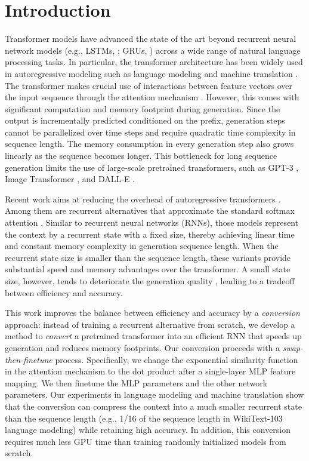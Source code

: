 \documentclass[11pt]{article}
\newcommand{\interalia}[1]{\citep[\emph{inter alia}]{#1}}
\begin{document}
\section{Introduction}
Transformer models \cite{Vaswani2017AttentionIA} have advanced the state of the art beyond recurrent neural network models (e.g., LSTMs, \citealp{hochreiter1997long}; GRUs, \citealp{cho-etal-2014-properties}) across a wide range of natural language processing tasks.
In particular, the transformer architecture has been widely used in autoregressive modeling such as language modeling \cite{Baevski2019AdaptiveIR} and machine translation \cite{Vaswani2017AttentionIA}.
The transformer makes crucial use of interactions between feature vectors over the input sequence through the attention mechanism \citep{Bahdanau2014NeuralMT}.
However, this comes with significant computation and memory footprint during generation.
Since the output is incrementally predicted 
conditioned on the prefix, generation steps cannot be parallelized over time steps
and require quadratic time complexity in sequence length.
The memory consumption in every generation step also grows linearly as the sequence becomes longer.
This bottleneck for long sequence generation limits the use of large-scale pretrained transformers, such as GPT-3 \cite{gpt3}, Image Transformer \cite{imagetransformer}, and DALL-E \cite{DALLE}.


Recent work aims at reducing 
the overhead
of autoregressive transformers \interalia{Child2019, Kitaev2020ReformerTE, longformer}. 
Among them are recurrent alternatives that approximate the standard softmax attention \cite{katharopoulos-et-al-2020, RFA, performer,schlag2021linear}.
Similar to recurrent neural networks (RNNs), those models represent the context by a recurrent state with a fixed size, thereby achieving linear time and constant memory complexity in generation sequence length.
When the recurrent state size is smaller than the sequence length, these variants provide substantial speed and memory advantages over the transformer.
A small state size, however, tends to deteriorate the generation quality \cite{RFA}, leading to a tradeoff between efficiency and accuracy.

This work improves the balance between efficiency and accuracy by a \textit{conversion} approach: instead of training a recurrent alternative from scratch, we develop a method to \textit{convert} a pretrained transformer into an efficient RNN that speeds up generation and reduces memory footprints.
Our conversion proceeds with a \textit{swap-then-finetune} process.
Specifically, we change the exponential similarity function in the attention mechanism to the dot product after a single-layer MLP feature mapping.
We then finetune the MLP parameters and the other network parameters.
Our experiments in language modeling and machine translation show that the conversion can compress the context into a much smaller recurrent state than the sequence length (e.g., 1/16 of the sequence length in WikiText-103 language modeling) while retaining high accuracy.
In addition, this conversion requires much less GPU time than training randomly initialized models from scratch.
\end{document}
